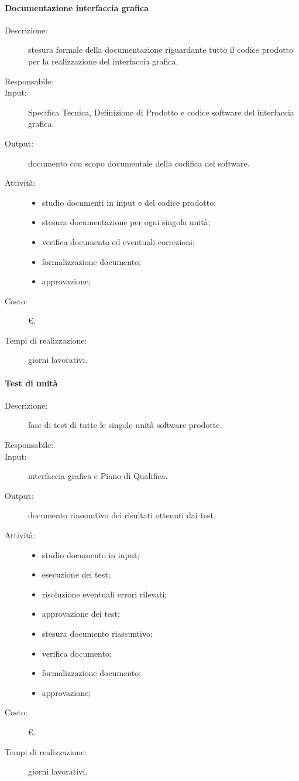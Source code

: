 \paragraph{Documentazione interfaccia grafica}
\begin{description}
\item[Descrizione:] stesura formale della documentazione riguardante tutto il codice prodotto per la realizzazione del interfaccia grafica.
\item[Responsabile:] 
\item[Input:] Specifica Tecnica, Definizione di Prodotto e codice software del interfaccia grafica.
\item[Output:] documento con scopo documentale della codifica del software.
\item[Attività:]
\begin{itemize}
\item studio documenti in input e del codice prodotto;
\item stesura documentazione per ogni singola unità;
\item verifica documento ed eventuali correzioni;
\item formalizzazione documento;
\item approvazione;
\end{itemize}
\item[Costo:] \euro{}.
\item[Tempi di realizzazione:]  giorni lavorativi.
\end{description}

\paragraph{Test di unità}
\begin{description}
\item[Descrizione:] fase di test di tutte le singole unità software prodotte.
\item[Responsabile:] 
\item[Input:] interfaccia grafica e Piano di Qualifica.
\item[Output:] documento riassuntivo dei risultati ottenuti dai test.
\item[Attività:]
\begin{itemize}
\item studio documento in input;
\item esecuzione dei test;
\item risoluzione eventuali errori rilevati;
\item approvazione dei test;
\item stesura documento riassuntivo;
\item verifica documento;
\item formalizzazione documento;
\item approvazione;
\end{itemize}
\item[Costo:] \euro{}.
\item[Tempi di realizzazione:]  giorni lavorativi.
\end{description}

